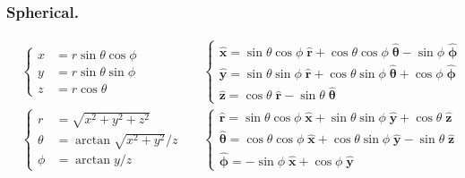 \documentclass[../main.tex]{subfiles}
\begin{document}
\subsubsection*{Spherical.}
\begin{align*}
   & \begin{cases}
        x &= r \sin \theta \cos \phi\\
        y &= r \sin \theta \sin \phi\\
        z & = r \cos \theta
    \end{cases}&&
    \begin{cases}
        \mathbf{\hat{x}} = \sin \theta \cos \phi \;\mathbf{\hat{r}} + \cos \theta \cos \phi \;\boldsymbol{\hat{\theta}} - \sin \phi \;\boldsymbol{\hat{\phi}}\\
        \mathbf{\hat{y}} = \sin \theta \sin \phi \;\mathbf{\hat{r}} + \cos \theta \sin \phi \;\boldsymbol{\hat{\theta}} + \cos \phi\;\boldsymbol{\hat{\phi}}\\
        \mathbf{\hat{z}} = \cos \theta\;\mathbf{\hat{r}} - \sin \theta \;\boldsymbol{\hat{\theta}}
    \end{cases}\\
   &
   \begin{cases}
        r &= \sqrt{x^2 + y^2 + z^2}\\
        \theta &=\arctan \sqrt{x^2 + y^2}/z\\
        \phi & = \arctan y/z
    \end{cases}&&
    \begin{cases} 
        \mathbf{\hat{r}} = \sin \theta \cos \phi \;\mathbf{\hat{x}} + \sin \theta \sin \phi \;\boldsymbol{\hat{y}} + \cos \theta \;\boldsymbol{\hat{z}}\\
        \boldsymbol{\hat{\theta}} = \cos \theta \cos \phi \;\mathbf{\hat{x}} + \cos \theta \sin \phi \;\boldsymbol{\hat{y}} - \sin \theta\;\boldsymbol{\hat{z}}\\
        \boldsymbol{\hat{\phi}} = -\sin \phi\;\mathbf{\hat{x}} + \cos \phi \;\boldsymbol{\hat{y}}
    \end{cases}
\end{align*}
\end{document}
